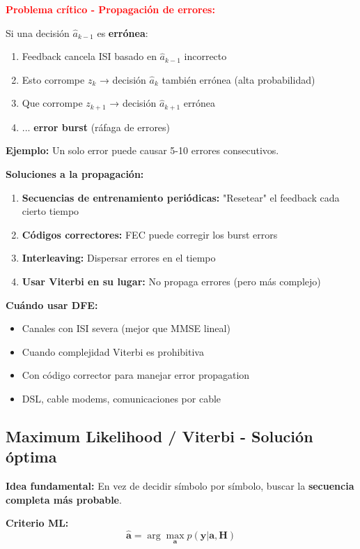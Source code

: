 \documentclass[10pt,a4paper]{article}
\begin{document}
\textbf{\textcolor{red}{Problema crítico - Propagación de errores:}}

Si una decisión $\hat{a}_{k-1}$ es \textbf{errónea}:
\begin{enumerate}
\item Feedback cancela ISI basado en $\hat{a}_{k-1}$ incorrecto
\item Esto corrompe $z_k$ → decisión $\hat{a}_k$ también errónea (alta probabilidad)
\item Que corrompe $z_{k+1}$ → decisión $\hat{a}_{k+1}$ errónea
\item ... \textbf{error burst} (ráfaga de errores)
\end{enumerate}

\textbf{Ejemplo:} Un solo error puede causar 5-10 errores consecutivos.

\textbf{Soluciones a la propagación:}
\begin{enumerate}
\item \textbf{Secuencias de entrenamiento periódicas:} "Resetear" el feedback cada cierto tiempo
\item \textbf{Códigos correctores:} FEC puede corregir los burst errors
\item \textbf{Interleaving:} Dispersar errores en el tiempo
\item \textbf{Usar Viterbi en su lugar:} No propaga errores (pero más complejo)
\end{enumerate}

\textbf{Cuándo usar DFE:}
\begin{itemize}
\item Canales con ISI severa (mejor que MMSE lineal)
\item Cuando complejidad Viterbi es prohibitiva
\item Con código corrector para manejar error propagation
\item DSL, cable modems, comunicaciones por cable
\end{itemize}

\subsection{Maximum Likelihood / Viterbi - Solución óptima}

\textbf{Idea fundamental:} En vez de decidir símbolo por símbolo, buscar la \textbf{secuencia completa más probable}.

\textbf{Criterio ML:}
$$\hat{\mathbf{a}} = \arg\max_{\mathbf{a}} p(\mathbf{y} | \mathbf{a}, \mathbf{H})$$
\end{document}
